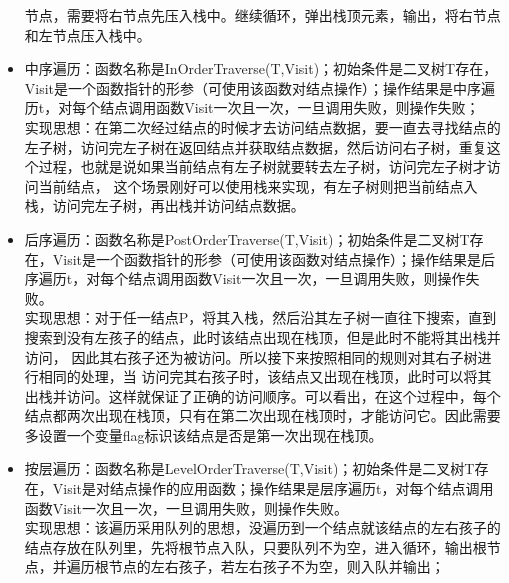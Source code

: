 \documentclass[supercite]{Experimental_Report}
\theoremstyle{definition}
\begin{document}
\begin{itemize}
	      节点，需要将右节点先压入栈中。继续循环，弹出栈顶元素，输出，将右节点和左节点压入栈中。
	\item 中序遍历：函数名称是InOrderTraverse(T,Visit)；初始条件是二叉树T存在，Visit是一个函数指针的形参（可使用该函数对结点操作）；操作结果是中序遍历t，对每个结点调用函数Visit一次且一次，一旦调用失败，则操作失败；\\
	      实现思想：在第二次经过结点的时候才去访问结点数据，要一直去寻找结点的左子树，访问完左子树在返回结点并获取结点数据，然后访问右子树，重复这个过程，也就是说如果当前结点有左子树就要转去左子树，访问完左子树才访问当前结点，
	      这个场景刚好可以使用栈来实现，有左子树则把当前结点入栈，访问完左子树，再出栈并访问结点数据。
	\item 后序遍历：函数名称是PostOrderTraverse(T,Visit)；初始条件是二叉树T存在，Visit是一个函数指针的形参（可使用该函数对结点操作）；操作结果是后序遍历t，对每个结点调用函数Visit一次且一次，一旦调用失败，则操作失败。\\
	      实现思想：对于任一结点P，将其入栈，然后沿其左子树一直往下搜索，直到搜索到没有左孩子的结点，此时该结点出现在栈顶，但是此时不能将其出栈并访问， 因此其右孩子还为被访问。所以接下来按照相同的规则对其右子树进行相同的处理，当
	      访问完其右孩子时，该结点又出现在栈顶，此时可以将其出栈并访问。这样就保证了正确的访问顺序。可以看出，在这个过程中，每个结点都两次出现在栈顶，只有在第二次出现在栈顶时，才能访问它。因此需要多设置一个变量flag标识该结点是否是第一次出现在栈顶。
	\item 按层遍历：函数名称是LevelOrderTraverse(T,Visit)；初始条件是二叉树T存在，Visit是对结点操作的应用函数；操作结果是层序遍历t，对每个结点调用函数Visit一次且一次，一旦调用失败，则操作失败。\\
	      实现思想：该遍历采用队列的思想，没遍历到一个结点就该结点的左右孩子的结点存放在队列里，先将根节点入队，只要队列不为空，进入循环，输出根节点，并遍历根节点的左右孩子，若左右孩子不为空，则入队并输出；

\end{itemize}
\end{document}
